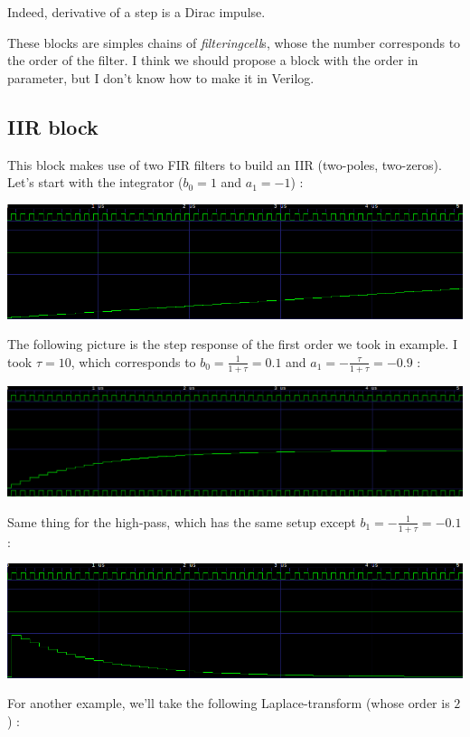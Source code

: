 \documentclass{report}
\begin{document}
Indeed, derivative of a step is a Dirac impulse.

These blocks are simples chains of \emph{filteringcell}s, whose the number corresponds to the order of the filter. I think we should propose a block with the order in parameter, but I don't know how to make it in Verilog.

\subsection*{IIR block}

This block makes use of two FIR filters to build an IIR (two-poles, two-zeros). Let's start with the integrator ($b_0=1$ and $a_1=-1$) :

\includegraphics[width=\textwidth]{images/integration.png}

The following picture is the step response of the first order we took in example. I took $\tau = 10$, which corresponds to $b_0 = \frac{1}{1+\tau} = 0.1$ and $a_1 = -\frac{\tau}{1+\tau} = -0.9$ :

\includegraphics[width=\textwidth]{images/firstordertau10.png}

Same thing for the high-pass, which has the same setup except $b_1 = -\frac{1}{1+\tau} = -0.1$ :

\includegraphics[width=\textwidth]{images/highpasstau10.png}

For another example, we'll take the following Laplace-transform (whose order is $2$) :
\end{document}
